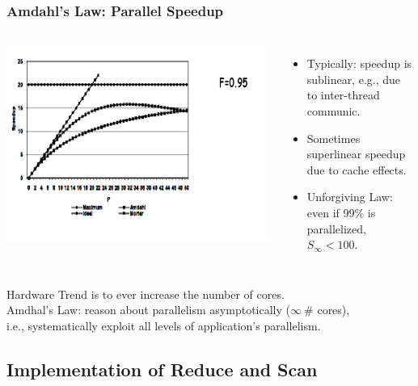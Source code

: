 \documentclass{beamer}
\begin{document}
\begin{frame}[fragile,t]
\frametitle{Amdahl's Law: Parallel Speedup}

\medskip

\begin{columns}
\includegraphics[width=44ex]{Figures/L1/ParSpeedup}
\vspace{-5ex}
\begin{itemize}
    \item Typically: speedup is sublinear, e.g., due to inter-thread communic. 
    \item Sometimes superlinear speedup due to cache effects.
    \item Unforgiving Law: even if $99\%$ is parallelized, $S_{\infty} < 100$.
\end{itemize}
\end{columns}

\pause
\vspace{-3ex}

Hardware Trend is to ever increase the number of cores.\\
\alert{Amdhal's Law: reason about parallelism asymptotically ($\infty \ \#$ cores),\\
i.e., systematically exploit all levels of application's parallelism.}

\end{frame}

\subsection{Implementation of Reduce and Scan}

\begin{frame}[fragile]
	\tableofcontents[currentsubsection]
\end{frame}
\end{document}

